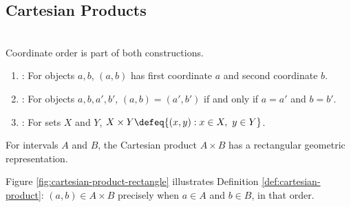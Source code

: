 \subsection{Cartesian Products}

\begin{definition} \label{def:cartesian-product} \\
Coordinate order is part of both constructions.
\begin{enumerate}[label=(\roman*)]
\setlength{\itemsep}{0pt}
\item {}: For objects $a,b$, $(a,b)$ has first coordinate $a$ and second coordinate $b$.
\item {}: For objects $a,b,a',b'$, $(a,b)=(a',b')$ if and only if $a=a'$ and $b=b'$.
\item {}: For sets $X$ and $Y$, $X\times Y\defeq\{(x,y):x\in X,\ y\in Y\}$.
\end{enumerate}
\end{definition}

For intervals $A$ and $B$, the Cartesian product $A\times B$ has a rectangular geometric representation.

\begin{illustrationfigure}[H]
    \centering
    
    \caption{The product region $A\times B$ for horizontal interval $A$ and vertical interval $B$.}
    \label{fig:cartesian-product-rectangle}
\end{illustrationfigure}

Figure \ref{fig:cartesian-product-rectangle} illustrates Definition \ref{def:cartesian-product}: $(a,b)\in A\times B$ precisely when $a\in A$ and $b\in B$, in that order.
